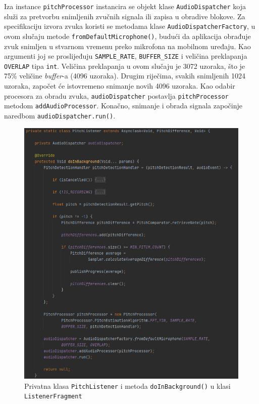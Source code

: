 \documentclass[times, utf8, zavrsni, numeric]{fer}
\begin{document}
Iza instance \verb|pitchProcessor| instancira se objekt klase \verb|AudioDispatcher| koja služi za pretvorbu snimljenih zvučnih signala ili zapisa u obradive blokove. Za specifikaciju izvora zvuka koristi se metodama klase \verb|AudioDispatcherFactory|, u ovom slučaju metode \verb|fromDefaultMicrophone()|, budući da aplikacija obrađuje zvuk snimljen u stvarnom vremenu preko mikrofona na mobilnom uređaju. Kao argumenti joj se proslijeđuju \verb|SAMPLE_RATE|, \verb|BUFFER_SIZE| i veličina preklapanja \verb|OVERLAP| tipa \verb|int|. Veličina preklapanja u ovom slučaju je 3072 uzoraka, što je 75\% veličine \textit{buffer}-a (4096 uzoraka). Drugim riječima, svakih snimljenih 1024 uzoraka, započet će istovremeno snimanje novih 4096 uzoraka. Kao odabir procesora za obradu zvuka, \verb|audioDispatcher| postavlja \verb|pitchProcessor| metodom \verb|addAudioProcessor|. Konačno, snimanje i obrada signala započinje naredbom \verb|audioDispatcher.run()|.


\renewcommand{\figurename}{Kod}
\begin{figure}
	\centerline{\includegraphics[width=\textwidth]{kod_PitchListener.png}}
	\cprotect\caption{Privatna klasa \verb|PitchListener| i metoda \verb|doInBackground()| u klasi \verb|ListenerFragment|}
	\label{fig}
\end{figure}
\clearpage
\end{document}
